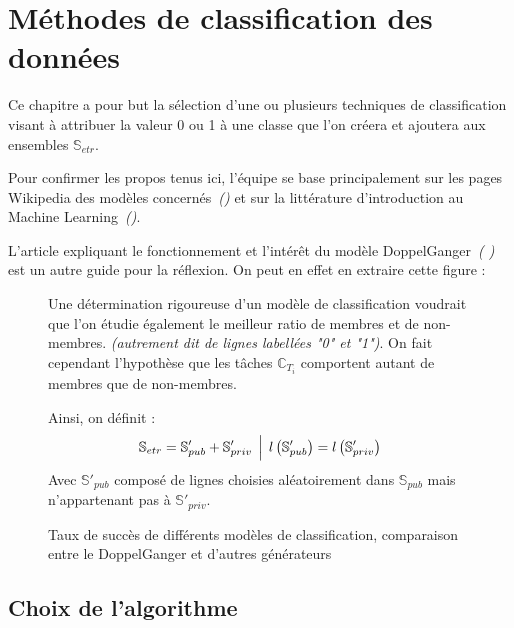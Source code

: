 \chapter{Méthodes de classification des données}\label{classif}
    Ce chapitre a pour but la sélection d'une ou plusieurs techniques de classification visant à
    attribuer la valeur 0 ou 1 à une classe que l'on créera et ajoutera aux ensembles
    $\mathbb S_{etr}$.

    Pour confirmer les propos tenus ici, l'équipe se base principalement sur les pages Wikipedia
    des modèles concernés~\textit{(\cite{wikiRL, wikiBN, wikiKNN, wikiTrainingValidationTest})} et sur la littérature
    d'introduction au Machine Learning~\textit{(\cite{introML, MLFondamentaux})}.

    L'article expliquant le fonctionnement et l'intérêt du modèle DoppelGanger~\textit{(
    \cite{doppelGANger})} est un autre guide pour la réflexion. On peut en effet en extraire
    cette figure :

    \begin{figure}[H]
        \centering
        {}
        \caption{Taux de succès de différents modèles de classification, comparaison entre le DoppelGanger et d'autres générateurs}\label{fig:ganclassifs}

    \begin{tcolorbox}[colback=linkborder_Color!5!white,colframe=linkborder_Color!75!black]
        Une détermination rigoureuse d'un modèle de classification voudrait que l'on étudie
        également le meilleur ratio de membres et de non-membres.
        \textit{(autrement dit de lignes labellées "0" et "1")}. On fait cependant l'hypothèse
        que les tâches $\mathbb C_{T_i}$ comportent autant de membres que de non-membres.

        Ainsi, on définit :
        \begin{equation}
            \mathbb{S}_{etr} = \mathbb{S}'_{pub} + \mathbb{S}'_{priv} \, \Bigm \lvert \, l
            \left( \mathbb{S}'_{pub} \right) = l\left( \mathbb{S}'_{priv} \right)
        \end{equation}
        Avec $\mathbb{S}'_{pub}$ composé de lignes choisies aléatoirement dans $\mathbb{S}_{pub}$ mais n'appartenant pas à $\mathbb{S}'_{priv}$.
    \end{tcolorbox}

    \end{figure}
    \newpage\section{Choix de l'algorithme}

